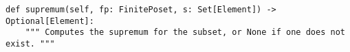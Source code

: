 \begin{verbatim}
def supremum(self, fp: FinitePoset, s: Set[Element]) -> Optional[Element]:
    """ Computes the supremum for the subset, or None if one does not exist. """
\end{verbatim}